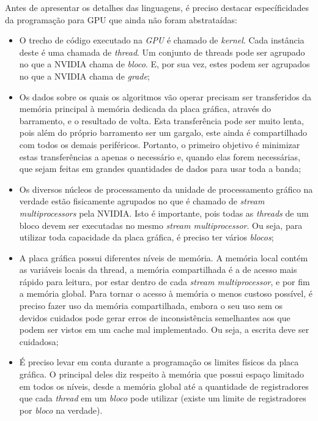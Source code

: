 Antes de apresentar os detalhes das linguagens, é preciso destacar específicidades da programação para GPU que ainda não foram abstrataídas:

\begin{itemize}
  \item O trecho de código executado na \textit{GPU} é chamado de \textit{kernel}. Cada instância deste é uma chamada de \textit{thread}. Um conjunto de threads pode ser agrupado no que a NVIDIA chama de \textit{bloco}. E, por sua vez, estes podem ser agrupados no que a NVIDIA chama de \textit{grade};
  \item Os dados sobre os quais os algoritmos vão operar precisam ser transferidos da memória principal à memória dedicada da placa gráfica, através do barramento, e o resultado de volta. Esta transferência pode ser muito lenta, pois além do próprio barramento ser um gargalo, este ainda é compartilhado com todos os demais periféricos. Portanto, o primeiro objetivo é minimizar estas transferências a apenas o necessário e, quando elas forem necessárias, que sejam feitas em grandes quantidades de dados para usar toda a banda;
  \item Os diversos núcleos de processamento da unidade de processamento gráfico na verdade estão fisicamente agrupados no que é chamado de \textit{stream multiprocessors} pela NVIDIA. Isto é importante, pois todas as \textit{threads} de um bloco devem ser executadas no mesmo \textit{stream multiprocessor}. Ou seja, para utilizar toda capacidade da placa gráfica, é preciso ter vários \textit{blocos};
  \item A placa gráfica possui diferentes níveis de memória. A memória local contém as variáveis locais da thread, a memória compartilhada é a de acesso mais rápido para leitura, por estar dentro de cada \textit{stream multiprocessor}, e por fim a memória global. Para tornar o acesso à memória o menos custoso possível, é preciso fazer uso da memória compartilhada, embora o seu uso sem os devidos cuidados pode gerar erros de inconsistência semelhantes aos que podem ser vistos em um cache mal implementado. Ou seja, a escrita deve ser cuidadosa;
  \item É preciso levar em conta durante a programação os limites físicos da placa gráfica. O principal deles diz respeito à memória que possui espaço limitado em todos os níveis, desde a memória global até a quantidade de registradores que cada \textit{thread} em um \textit{bloco} pode utilizar (existe um limite de registradores por \textit{bloco} na verdade).
\end{itemize}
